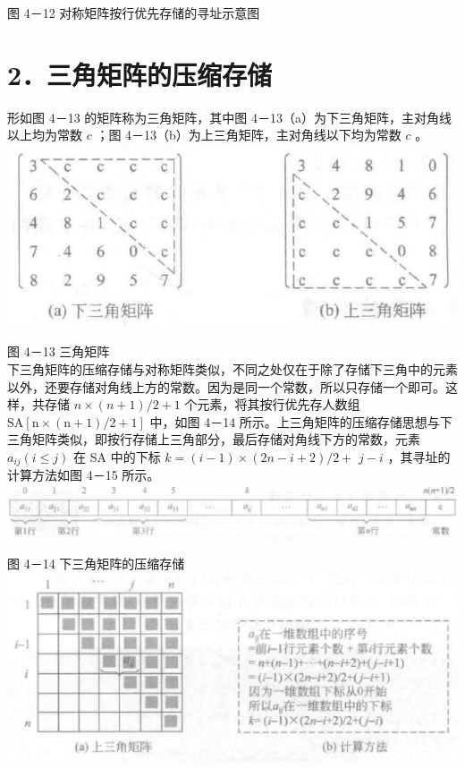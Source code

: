 \documentclass[10pt]{article}
\begin{document}
图 4－12 对称矩阵按行优先存储的寻址示意图

\section*{2．三角矩阵的压缩存储}
形如图 4－13 的矩阵称为三角矩阵，其中图 4－13（a）为下三角矩阵，主对角线以上均为常数 $c$ ；图 4－13（b）为上三角矩阵，主对角线以下均为常数 $c$ 。\\
\includegraphics[max width=\textwidth, center]{2025_06_06_704745ea57b15b2333e5g-123(3)}

图 4－13 三角矩阵\\
下三角矩阵的压缩存储与对称矩阵类似，不同之处仅在于除了存储下三角中的元素以外，还要存储对角线上方的常数。因为是同一个常数，所以只存储一个即可。这样，共存储 $n \times(n+1) / 2+1$ 个元素，将其按行优先存人数组 $\mathrm{SA}[\mathrm{n} \times(\mathrm{n}+1) / 2+1]$ 中，如图 4－14 所示。上三角矩阵的压缩存储思想与下三角矩阵类似，即按行存储上三角部分，最后存储对角线下方的常数，元素 $a_{i j}(i \leqslant j)$ 在 SA 中的下标 $k=(i-1) \times(2 n-i+2) / 2+$ $j-i$ ，其寻址的计算方法如图 4－15 所示。\\
\includegraphics[max width=\textwidth, center]{2025_06_06_704745ea57b15b2333e5g-124(1)}

图 4－14 下三角矩阵的压缩存储\\
\includegraphics[max width=\textwidth, center]{2025_06_06_704745ea57b15b2333e5g-124(2)}
\end{document}
